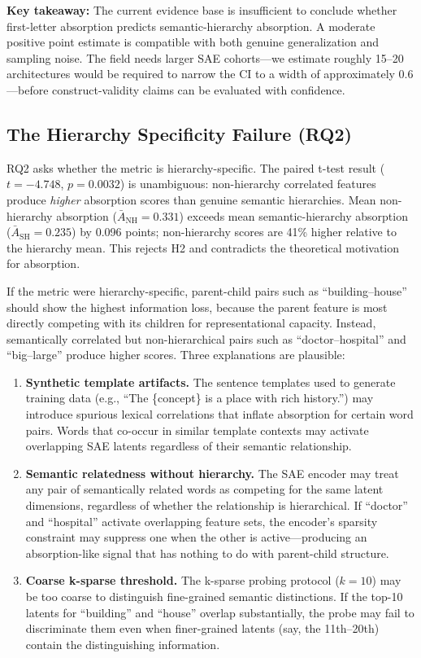 \documentclass{article}
\begin{document}
\textbf{Key takeaway:} The current evidence base is insufficient to conclude whether first-letter absorption predicts semantic-hierarchy absorption. A moderate positive point estimate is compatible with both genuine generalization and sampling noise. The field needs larger SAE cohorts---we estimate roughly 15--20 architectures would be required to narrow the CI to a width of approximately $0.6$---before construct-validity claims can be evaluated with confidence.

\subsection{The Hierarchy Specificity Failure (RQ2)}

RQ2 asks whether the metric is hierarchy-specific. The paired t-test result ($t = -4.748$, $p = 0.0032$) is unambiguous: non-hierarchy correlated features produce \emph{higher} absorption scores than genuine semantic hierarchies. Mean non-hierarchy absorption ($\bar{A}_{\text{NH}} = 0.331$) exceeds mean semantic-hierarchy absorption ($\bar{A}_{\text{SH}} = 0.235$) by 0.096 points; non-hierarchy scores are 41\% higher relative to the hierarchy mean. This rejects H2 and contradicts the theoretical motivation for absorption.

If the metric were hierarchy-specific, parent-child pairs such as ``building--house'' should show the highest information loss, because the parent feature is most directly competing with its children for representational capacity. Instead, semantically correlated but non-hierarchical pairs such as ``doctor--hospital'' and ``big--large'' produce higher scores. Three explanations are plausible:

\begin{enumerate}
  \item \textbf{Synthetic template artifacts.} The sentence templates used to generate training data (e.g., ``The \{concept\} is a place with rich history.'') may introduce spurious lexical correlations that inflate absorption for certain word pairs. Words that co-occur in similar template contexts may activate overlapping SAE latents regardless of their semantic relationship.
  \item \textbf{Semantic relatedness without hierarchy.} The SAE encoder may treat any pair of semantically related words as competing for the same latent dimensions, regardless of whether the relationship is hierarchical. If ``doctor'' and ``hospital'' activate overlapping feature sets, the encoder's sparsity constraint may suppress one when the other is active---producing an absorption-like signal that has nothing to do with parent-child structure.
  \item \textbf{Coarse k-sparse threshold.} The k-sparse probing protocol ($k = 10$) may be too coarse to distinguish fine-grained semantic distinctions. If the top-10 latents for ``building'' and ``house'' overlap substantially, the probe may fail to discriminate them even when finer-grained latents (say, the 11th--20th) contain the distinguishing information.
\end{enumerate}
\end{document}
